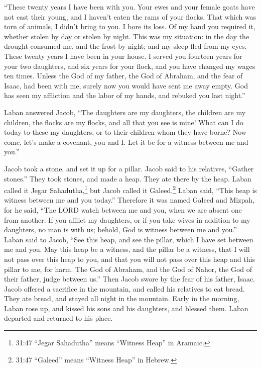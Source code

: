 \myverse{}“These twenty years I have been with you. Your ewes and your female goats have not cast their young, and I haven’t eaten the rams of your flocks.  \myverse{}That which was torn of animals, I didn’t bring to you. I bore its loss. Of my hand you required it, whether stolen by day or stolen by night.  \myverse{}This was my situation: in the day the drought consumed me, and the frost by night; and my sleep fled from my eyes.  \myverse{}These twenty years I have been in your house. I served you fourteen years for your two daughters, and six years for your flock, and you have changed my wages ten times.  \myverse{} Unless the God of my father, the God of Abraham, and the fear of Isaac, had been with me, surely now you would have sent me away empty. God has seen my affliction and the labor of my hands, and rebuked you last night.”

\myverse{}Laban answered Jacob, “The daughters are my daughters, the children are my children, the flocks are my flocks, and all that you see is mine! What can I do today to these my daughters, or to their children whom they have borne?  \myverse{}Now come, let’s make a covenant, you and I. Let it be for a witness between me and you.”

\myverse{}Jacob took a stone, and set it up for a pillar.  \myverse{}Jacob said to his relatives, “Gather stones.” They took stones, and made a heap. They ate there by the heap.  \myverse{}Laban called it Jegar Sahadutha,\footnote{31:47 “Jegar Sahadutha” means “Witness Heap” in Aramaic.} but Jacob called it Galeed.\footnote{31:47 “Galeed” means “Witness Heap” in Hebrew.}  \myverse{}Laban said, “This heap is witness between me and you today.” Therefore it was named Galeed  \myverse{}and Mizpah, for he said, “The LORD watch between me and you, when we are absent one from another.  \myverse{}If you afflict my daughters, or if you take wives in addition to my daughters, no man is with us; behold, God is witness between me and you.”  \myverse{}Laban said to Jacob, “See this heap, and see the pillar, which I have set between me and you.  \myverse{}May this heap be a witness, and the pillar be a witness, that I will not pass over this heap to you, and that you will not pass over this heap and this pillar to me, for harm.  \myverse{}The God of Abraham, and the God of Nahor, the God of their father, judge between us.” Then Jacob swore by the fear of his father, Isaac.  \myverse{}Jacob offered a sacrifice in the mountain, and called his relatives to eat bread. They ate bread, and stayed all night in the mountain. \myverse{}Early in the morning, Laban rose up, and kissed his sons and his daughters, and blessed them. Laban departed and returned to his place.

